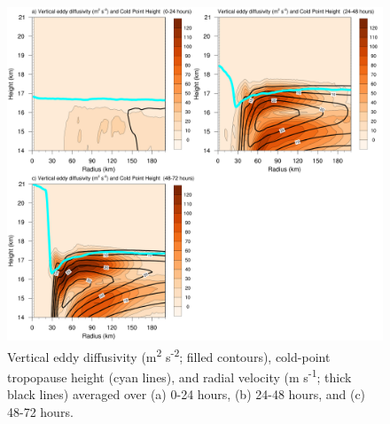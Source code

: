 \begin{figure}[ht]
\centerline{\includegraphics[width=39pc]{figures/khvten.png}}
\caption{Vertical eddy diffusivity (m\textsuperscript{2} s\textsuperscript{-2}; filled contours), cold-point tropopause height (cyan lines), and radial velocity (m s\textsuperscript{-1}; thick black lines) averaged over (a) 0-24 hours, (b) 24-48 hours, and (c) 48-72 hours.}
\label{fig:diff}
\end{figure}

